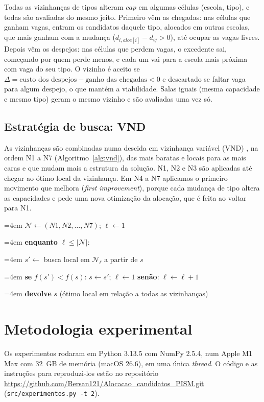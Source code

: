 \documentclass[12pt]{article}
\newcommand{\linha}[1]{\par\noindent\hangindent=4em\hangafter=1\makebox[1.4em][r]{\scriptsize #1}\hspace{0.6em}}
\begin{document}
Todas as vizinhanças de tipos alteram $\mathit{cap}$ em algumas células (escola, tipo), e todas
são avaliadas do mesmo jeito. Primeiro vêm as chegadas: nas células que ganham vagas, entram os
candidatos daquele tipo, alocados em outras escolas, que mais ganham com a mudança
($d_{i,\mathit{aloc}[i]} - d_{ij} > 0$), até ocupar as vagas livres. Depois vêm os despejos: nas
células que perdem vagas, o excedente sai, começando por quem perde menos, e cada um vai para a
escola mais próxima com vaga do seu tipo. O vizinho é aceito se
$\Delta = \text{custo dos despejos} - \text{ganho das chegadas} < 0$ e descartado se faltar vaga
para algum despejo, o que mantém a viabilidade. Salas iguais (mesma capacidade e mesmo tipo) geram
o mesmo vizinho e são avaliadas uma vez só.

\subsection{Estratégia de busca: VND}

As vizinhanças são combinadas numa descida em vizinhança variável (VND) \cite{mladenovic1997}, na
ordem N1 a N7 (Algoritmo~\ref{alg:vnd}), das mais baratas e locais para as mais caras e que mudam
mais a estrutura da solução. N1, N2 e N3 são aplicadas até chegar ao ótimo local da vizinhança. Em
N4 a N7 aplicamos o primeiro movimento que melhora (\emph{first improvement}), porque cada mudança
de tipo altera as capacidades e pede uma nova otimização da alocação, que é feita ao voltar
para N1.

\begin{algoritmo}[htbp]
  \caption{VND.}\label{alg:vnd}
  \small
  \linha{1} $\mathcal{N} \gets (N1, N2, \ldots, N7)$; $\ell \gets 1$
  \linha{2} \textbf{enquanto} $\ell \le |\mathcal{N}|$:
  \linha{3} \quad $s' \gets$ busca local em $\mathcal{N}_\ell$ a partir de $s$
  \linha{4} \quad \textbf{se} $f(s') < f(s)$: $s \gets s'$; $\ell \gets 1$ \quad
    \textbf{senão}: $\ell \gets \ell + 1$
  \linha{5} \textbf{devolve} $s$ \quad (ótimo local em relação a todas as vizinhanças)
\end{algoritmo}

\section{Metodologia experimental}\label{sec:experimentos}

Os experimentos rodaram em Python 3.13.5 com NumPy 2.5.4, num Apple M1 Max com 32~GB de memória
(macOS 26.6), em uma única \emph{thread}. O código e as instruções para reproduzi-los estão no
repositório \url{https://github.com/Bersan121/Alocacao_candidatos_PISM.git}
(\texttt{src/experimentos.py -t 2}).
\end{document}
